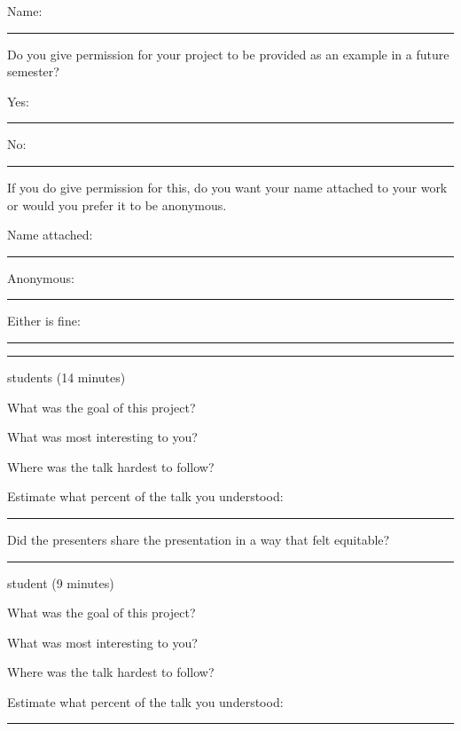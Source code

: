 \documentclass[12pt,letterpaper,noanswers]{exam}
\begin{document}
 \pdfpageheight 11in 
  \pdfpagewidth 8.5in
  
  Name: \rule{2.5in}{0.5pt}
  \vspace{1cm}
  
  Do you give permission for your project to be provided as an example in a future semester? 
  \vspace{0.3cm}
  
  \quad Yes: \rule{0.5in}{0.5pt} \quad No: \rule{0.5in}{0.5pt}
  \vspace{2cm}
  
  If you do give permission for this, do you want your name attached to your work or would you prefer it to be anonymous.
  \vspace{0.3cm}
  
  \quad Name attached: \rule{0.5in}{0.5pt} \quad Anonymous: \rule{0.5in}{0.5pt} \quad Either is fine: \rule{0.5in}{0.5pt}
  \vspace{0.3cm}
  
  
   \hrule
  \vspace{0.1cm}
  
  students (14 minutes)
  
 \noindent What was the goal of this project?
\vfill
 
 \noindent What was most interesting to you?
\vfill
 
 \noindent Where was the talk hardest to follow?
\vfill
 
 \noindent Estimate what percent of the talk you understood:  \rule{0.5in}{0.5pt}
 
 \noindent Did the presenters share the presentation in a way that felt equitable?
\vfill
 
 \hrule
  \vspace{0.1cm}
  
    student
   (9 minutes)
 
 
  \noindent What was the goal of this project?
\vfill
 
 \noindent What was most interesting to you?
\vfill
 
 \noindent Where was the talk hardest to follow?
\vfill
 
 \noindent Estimate what percent of the talk you understood:  \rule{0.5in}{0.5pt}
 

 
 \vspace{0.1cm}
\eject 
 
\end{document}
